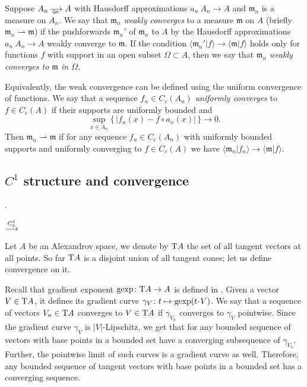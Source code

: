 Suppose $A_n\GHto A$ with Hausdorff approximations $a_n\:A_n\to A$ and
$\mathfrak m_n$ is a measure on $A_n$.
We say that $\mathfrak m_n$ \emph{weakly converges} to a measure $\mathfrak m$ on $A$ (briefly $\mathfrak m_n\rightharpoonup \mathfrak m$) if the pushforwards $\mathfrak m_n'$ of $\mathfrak m_n$ to $A$  by the Hausdorff approximations $a_n\:A_n\to A$ weakly converge to 
$\mathfrak m$.
If the condition $\langle \mathfrak m_n'|f\rangle \to \langle \mathfrak m|f\rangle $ holds only for functions $f$ with support in an open subset $\Omega\subset A$, then we say that $\mathfrak m_n$ \emph{weakly converges to $\mathfrak m$ in $\Omega$}.

Equivalently, the weak convergence can be defined using the uniform convergence of functions.
We say that  a sequence $f_n\in C_c(A_n)$
\emph{uniformly converges} to $f\in C_c(A)$
if their supports are uniformly bounded and
\[\sup_{x\in A_n}\{\,|f_n(x)-f\circ a_n(x)|\,\}\to 0.\]
Then  $\mathfrak m_n\rightharpoonup \mathfrak m$
if for any sequence $f_n\in C_c(A_n)$
with uniformly bounded supports and
uniformly converging to $f\in C_c(A)$
we have $\langle \mathfrak m_n|f_n\rangle \to \langle \mathfrak m|f\rangle $.








\subsection{ $C^1$ structure and convergence}\label{sec:concept}. 

$\stackrel{C^1_\delta}{\longrightarrow}$


Let $A$ be an Alexandrov space, we denote by $\mathrm{T} A$ the set of all tangent vectors at all points.
So far $\mathrm{T} A$ is a disjoint union of all tangent cones;
let us define convergence on it.

Recall that gradient exponent $\mathop{\rm gexp}\colon \mathrm{T} A\to A$ is defined in \cite{AKP}.
Given a vector $V\in \mathrm{T} A$, it defines its gradient curve $\gamma_{V}\:t\mapsto \gexp (t\cdot V)$.
We say that a sequence of vectors $V_n\in \mathrm{T} A$ converges to $V\in \mathrm{T} A$ if $\gamma_{V_n}$ converges to $\gamma_V$ pointwise.
Since the gradient curve $\gamma_V$ is $|V|$-Lipschitz, we get that for any bounded sequence of vectors with base points in a bounded set have a converging subsequence of $\gamma_{V_n}$.
Further, the pointwise limit of such curves is a gradient curve as well.
Therefore, any bounded sequence of tangent vectors with base points in a bounded set has a converging sequence.


